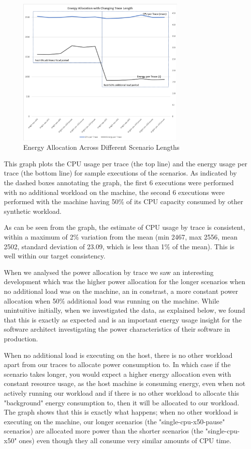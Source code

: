 \begin{figure}
\centering
\includegraphics[width=0.75\textwidth,trim={2 2 2 2},clip]{Figures/validation-scenariolength}
\caption{Energy Allocation Across Different Scenario Lengths}
\label{figure:validation-scenariolength}
\end{figure}

This graph plots the CPU usage per trace (the top line) and the energy usage per trace (the bottom line) for sample executions of the scenarios.  As indicated by the dashed boxes annotating the graph, the first 6 executions were performed with no additional workload on the machine, the second 6 executions were performed with the machine having 50\% of its CPU capacity consumed by other synthetic workload.

As can be seen from the graph, the estimate of CPU usage by trace is consistent, within a maximum of 2\% variation from the mean (min 2467, max 2556, mean 2502, standard deviation of 23.09, which is less than 1\% of the mean).  This is well within our target consistency.

When we analysed the power allocation by trace we saw an interesting development which was the higher power allocation for the longer scenarios when no additional load was on the machine, an in constrast, a more constant power allocation when 50\% additional load was running on the machine.  While unintuitive initially, when we investigated the data, as explained below, we found that this is exactly as expected and is an important energy usage insight for the software architect investigating the power characteristics of their software in production.  

When no additional load is executing on the host, there is no other workload apart from our traces to allocate power consumption to.  In which case if the scenario takes longer, you would expect a higher energy allocation even with constant resource usage, as the host machine is consuming energy, even when not actively running our workload and if there is no other workload to allocate this "background" energy consumption to, then it will be allocated to our workload.  The graph shows that this is exactly what happens; when no other workload is executing on the machine, our longer scenarios (the "single-cpu-x50-pause" scenarios) are allocated more power than the shorter scenarios (the "single-cpu-x50" ones) even though they all consume very similar amounts of CPU time.


